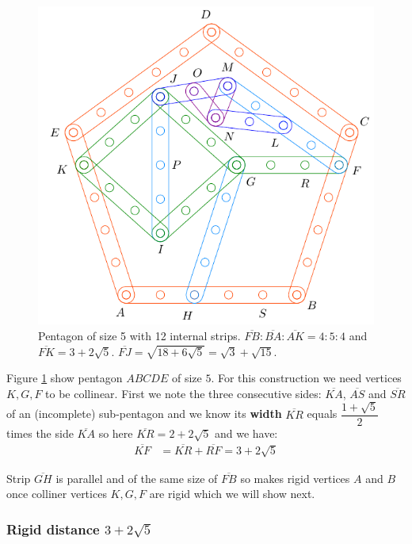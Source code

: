 \documentclass[11pt]{article}
\begin{document}
\begin{figure}[h]
\centering
\includegraphics[scale=0.9]{5/penta5-12a}
\caption{Pentagon of size 5 with 12 internal strips. $\overline{FB} : \overline{BA} : \overline{AK} = 4:5:4$ and $\overline{FK} = 3 + 2\sqrt5$. $\overline{FJ} = \sqrt{18+6\sqrt5} = \sqrt3 + \sqrt{15}$.}
\label{fig:penta5-12a}
\end{figure}

Figure \ref{fig:penta5-12a} show pentagon $ABCDE$ of size $5$. For this construction we need vertices $K,G,F$ to be collinear. First we note the three consecutive sides: $\overline{KA}$, $\overline{AS}$ and $\overline{SR}$ of an (incomplete) sub-pentagon and we know its \textbf{width} $\overline{KR}$ equals $\dfrac{1+\sqrt5}2$ times the side $\overline{KA}$ so here $\overline{KR} = 2 + 2\sqrt5$ and we have:
\begin{align}
\overline{KF} &= \overline{KR} + \overline{RF} = 3 + 2\sqrt5
\end{align}

Strip $\overline{GH}$ is parallel and of the same size of $\overline{FB}$ so makes rigid vertices $A$ and $B$ once colliner vertices $K,G,F$ are rigid which we will show next.

\subsubsection{Rigid distance $3+2\sqrt5$}
\end{document}
